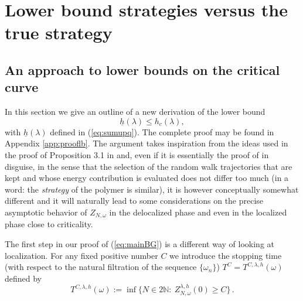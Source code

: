 \documentclass[reqno,11pt]{amsart}
\numberwithin{equation}{section}
\newtheorem{rem}[theorem]{Remark}
\newcommand{\N}{\mathbb{N}}
\newcommand{\go}{\omega}
\newcommand{\gl}{\lambda}
\begin{document}


\bigskip

\section{Lower bound strategies versus the true strategy}
\label{sec:lb}

\subsection{An approach to lower bounds on the critical curve}
\label{sec:lb_outline}
In this section we give an outline of a new derivation of the lower bound
\begin{equation}
\label{eq:mainBG}
\underline h (\gl)\le h_c(\gl),
\end{equation}
with $\underline h (\gl)$ defined in (\ref{eq:sumupq}). The complete proof may be found
in Appendix \ref{app:prooflb}. The argument takes inspiration from the ideas used in the proof of Proposition 3.1 in \cite{cf:GT} and, even if it is essentially the proof of \cite{cf:BG} in disguise,
in the sense that the selection of the random walk trajectories that are kept
and whose energy contribution is evaluated
does not differ too much (in a word: the {\sl strategy} of the polymer
is similar), it is however conceptually somewhat different and it
will naturally lead to some considerations on the precise
asymptotic behavior of $Z_{N, \go}$ in the delocalized phase and
even in the localized phase close to criticality.

\bigskip

The first step in our proof of (\ref{eq:mainBG}) is a different way of looking at localization. For any fixed positive number $C$ we introduce the stopping time (with respect to the natural filtration of the sequence $\{\go_n\}$) $T^C = T^{C,\gl,h}(\go)$ defined by
\begin{equation}
\label{eq:T^C}
T^{C,\gl,h}(\go) := \inf \{N\in 2\N:\ Z_{N,\go}^{\gl,h}(0) \ge C\}\,.
\end{equation}
\end{document}
